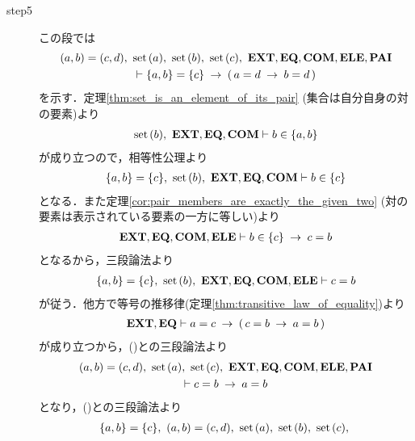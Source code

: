 \begin{sketch}
\begin{description}
			\item[step5] この段では
				\begin{align}
					\begin{gathered}
						(a,b) = (c,d),\ \set{a},\ \set{b},\ \set{c},\ 
						\EXTAX,\EQAX,\COMAX,\ELEAX,\PAIAX \\ 
						\vdash \{a,b\} = \{c\} \rarrow (\, a = d \rarrow b = d\, )
					\end{gathered}
				\end{align}
				を示す．定理\ref{thm:set_is_an_element_of_its_pair} (集合は自分自身の対の要素)より
				\begin{align}
					\operatorname*{set}\hspace{0.15em}(b),\ \mbox{{\bf EXT}},\mbox{{\bf EQ}},\mbox{\bf COM} \vdash b \in \{a,b\}
					\label{fom:equality_of_ordered_pairs_8}
				\end{align}
				が成り立つので，相等性公理より
				\begin{align}
					\{a,b\} = \{c\},\ \operatorname*{set}\hspace{0.15em}(b),\ \mbox{{\bf EXT}},\mbox{{\bf EQ}},\mbox{\bf COM} \vdash b \in \{c\}
				\end{align}
				となる．また定理\ref{cor:pair_members_are_exactly_the_given_two}
				(対の要素は表示されている要素の一方に等しい)より
				\begin{align}
					\mbox{{\bf EXT}},\mbox{{\bf EQ}},\mbox{\bf COM},\mbox{{\bf ELE}} \vdash b \in \{c\} \hspace{0.25em}\rightarrow\hspace{0.25em} c = b
				\end{align}
				となるから，三段論法より
				\begin{align}
					\{a,b\} = \{c\},\ \set{b},\ \EXTAX,\EQAX,\COMAX,\ELEAX \vdash c = b
					\label{fom:equality_of_ordered_pairs_6}
				\end{align}
				が従う．他方で等号の推移律(定理\ref{thm:transitive_law_of_equality})より
				\begin{align}
					\mbox{{\bf EXT}},\mbox{{\bf EQ}} \vdash a = c \hspace{0.25em}\rightarrow\hspace{0.25em} (\, c = b \hspace{0.25em}\rightarrow\hspace{0.25em} a = b\, )
				\end{align}
				が成り立つから，()との三段論法より
				\begin{align}
					\begin{gathered}
						(a,b) = (c,d),\ \set{a},\ \set{c},\ \EXTAX,\EQAX,\COMAX,\ELEAX,\PAIAX \\
						\vdash c = b \rarrow a = b
					\end{gathered}
					\label{fom:equality_of_ordered_pairs_11}
				\end{align}
				となり，()との三段論法より
				\begin{align}
					\begin{gathered}
						\{a,b\} = \{c\},\ (a,b) = (c,d),\ \set{a},\ \set{b},\ \set{c},\ 

\end{gathered}
\end{align}
\end{description}
\end{sketch}
